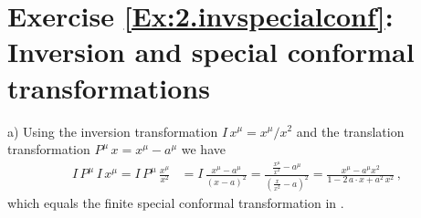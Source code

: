 \section*{Exercise \ref{Ex:2.invspecialconf}: Inversion and special conformal transformations}
\label{Sol:2.invspecialconf}
%
\noindent
a) Using the inversion transformation $I \, x^{\mu}= x^{\mu}/x^{2}$ and the translation
transformation $P^{\mu} \, x = x^{\mu }-a^{\mu}$ we 
have
%
\begin{align}
I \, P^{\mu} \, I \, x^{\mu}= I \, P^{\mu} \, \frac{x^{\mu}}{x^{2}} & =
 I \, \frac{x^{\mu}-a^{\mu}}{(x-a)^{2}} = 
\frac{\frac{x^{\mu}}{x^{2}}-a^{\mu}}{\left(\frac{x}{x^{2}}-a \right)^{2}}=
\frac{x^{\mu}-a^{\mu}x^{2}}{1-2 \, a\cdot x + a^{2}\, x^{2}} \,,
\end{align}
%
which equals the finite special conformal transformation in .
\medskip

